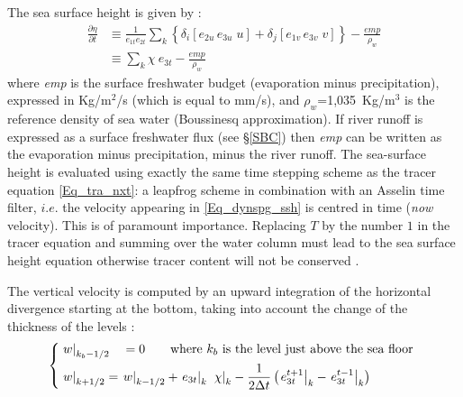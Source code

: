 The sea surface height is given by :
\begin{equation} \label{Eq_dynspg_ssh}
\begin{aligned}
\frac{\partial \eta }{\partial t}
&\equiv    \frac{1}{e_{1t} e_{2t} }\sum\limits_k { \left\{  \delta _i \left[ {e_{2u}\,e_{3u}\;u} \right]
                                                                                  +\delta _j \left[ {e_{1v}\,e_{3v}\;v} \right]  \right\} } 
           -    \frac{\textit{emp}}{\rho _w }   \\
&\equiv    \sum\limits_k {\chi \ e_{3t}}  -  \frac{\textit{emp}}{\rho _w }
\end{aligned}
\end{equation}
where \textit{emp} is the surface freshwater budget (evaporation minus precipitation), 
expressed in Kg/m$^2$/s (which is equal to mm/s), and $\rho _w$=1,035~Kg/m$^3$ 
is the reference density of sea water (Boussinesq approximation). If river runoff is 
expressed as a surface freshwater flux (see \S\ref{SBC}) then \textit{emp} can be 
written as the evaporation minus precipitation, minus the river runoff. 
The sea-surface height is evaluated using exactly the same time stepping scheme 
as the tracer equation \eqref{Eq_tra_nxt}: 
a leapfrog scheme in combination with an Asselin time filter, $i.e.$ the velocity appearing 
in \eqref{Eq_dynspg_ssh} is centred in time (\textit{now} velocity). 
This is of paramount importance. Replacing $T$ by the number $1$ in the tracer equation and summing
over the water column must lead to the sea surface height equation otherwise tracer content
will not be conserved \citep{Griffies_al_MWR01, Leclair_Madec_OM09}.

The vertical velocity is computed by an upward integration of the horizontal 
divergence starting at the bottom, taking into account the change of the thickness of the levels :
\begin{equation} \label{Eq_wzv}
\left\{   \begin{aligned}
&\left. w \right|_{k_b-1/2} \quad= 0    \qquad \text{where } k_b \text{ is the level just above the sea floor }  	\\
&\left. w \right|_{k+1/2}     = \left. w \right|_{k-1/2}  +  \left. e_{3t} \right|_{k}\;  \left. \chi \right|_k  
                                         - \frac{1} {2 \Delta t} \left(  \left. e_{3t}^{t+1}\right|_{k} - \left. e_{3t}^{t-1}\right|_{k}\right)
\end{aligned}   \right.
\end{equation}

